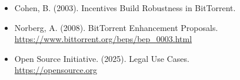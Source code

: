 \documentclass[a0paper,landscape]{a0poster}
\begin{document}
\begin{multicols}{3}
\begin{itemize}[leftmargin=*]
  \item Cohen, B. (2003). Incentives Build Robustness in BitTorrent.
  \item Norberg, A. (2008). BitTorrent Enhancement Proposals.\\
  \url{https://www.bittorrent.org/beps/bep_0003.html}
  \item Open Source Initiative. (2025). Legal Use Cases.\\
  \url{https://opensource.org}
\end{itemize}

\end{multicols} %
\end{document}
